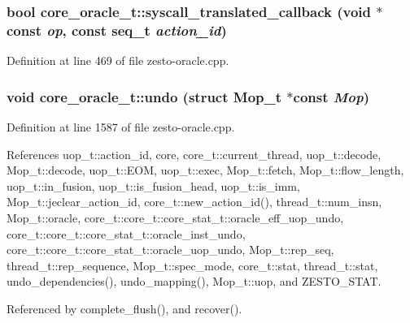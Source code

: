 \subsubsection[{syscall\_\-translated\_\-callback}]{\setlength{\rightskip}{0pt plus 5cm}bool core\_\-oracle\_\-t::syscall\_\-translated\_\-callback (void $\ast$const  {\em op}, \/  const {\bf seq\_\-t} {\em action\_\-id})\hspace{0.3cm}{\tt  [static, protected]}}\label{classcore__oracle__t_a288707f42533b1b2397e9b9b59c2e0f}




Definition at line 469 of file zesto-oracle.cpp.
\subsubsection[{undo}]{\setlength{\rightskip}{0pt plus 5cm}void core\_\-oracle\_\-t::undo (struct {\bf Mop\_\-t} $\ast$const  {\em Mop})\hspace{0.3cm}{\tt  [protected]}}\label{classcore__oracle__t_0d7765bb5655c1dd28f758143caaa8ce}




Definition at line 1587 of file zesto-oracle.cpp.

References uop\_\-t::action\_\-id, core, core\_\-t::current\_\-thread, uop\_\-t::decode, Mop\_\-t::decode, uop\_\-t::EOM, uop\_\-t::exec, Mop\_\-t::fetch, Mop\_\-t::flow\_\-length, uop\_\-t::in\_\-fusion, uop\_\-t::is\_\-fusion\_\-head, uop\_\-t::is\_\-imm, Mop\_\-t::jeclear\_\-action\_\-id, core\_\-t::new\_\-action\_\-id(), thread\_\-t::num\_\-insn, Mop\_\-t::oracle, core\_\-t::core\_\-t::core\_\-stat\_\-t::oracle\_\-eff\_\-uop\_\-undo, core\_\-t::core\_\-t::core\_\-stat\_\-t::oracle\_\-inst\_\-undo, core\_\-t::core\_\-t::core\_\-stat\_\-t::oracle\_\-uop\_\-undo, Mop\_\-t::rep\_\-seq, thread\_\-t::rep\_\-sequence, Mop\_\-t::spec\_\-mode, core\_\-t::stat, thread\_\-t::stat, undo\_\-dependencies(), undo\_\-mapping(), Mop\_\-t::uop, and ZESTO\_\-STAT.

Referenced by complete\_\-flush(), and recover().

